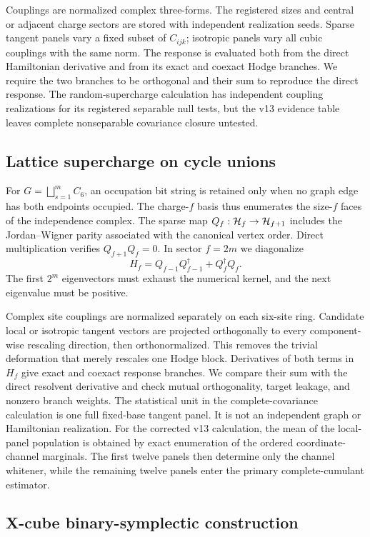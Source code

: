 Couplings are normalized complex three-forms.  The registered sizes and
central or adjacent charge sectors are stored with independent realization
seeds.  Sparse tangent panels vary a fixed subset of $C_{ijk}$; isotropic
panels vary all cubic couplings with the same norm.  The response is evaluated
both from the direct Hamiltonian derivative and from its exact and coexact
Hodge branches.  We require the two branches to be orthogonal and their sum to
reproduce the direct response.  The random-supercharge calculation has
independent coupling realizations for its registered separable null tests, but
the v13 evidence table leaves complete nonseparable covariance closure
untested.

\subsection{Lattice supercharge on cycle unions}

For $G=\bigsqcup_{s=1}^{m}C_6$, an occupation bit string is retained only when
no graph edge has both endpoints occupied.  The charge-$f$ basis thus
enumerates the size-$f$ faces of the independence complex.  The sparse map
$Q_f:\mathcal H_f\rightarrow\mathcal H_{f+1}$ includes the Jordan--Wigner parity associated
with the canonical vertex order.  Direct multiplication verifies
$Q_{f+1}Q_f=0$.  In sector $f=2m$ we diagonalize
\[
 H_f=Q_{f-1}Q_{f-1}^\dagger+Q_f^\dagger Q_f.
\]
The first $2^m$ eigenvectors must exhaust the numerical kernel, and the next
eigenvalue must be positive.

Complex site couplings are normalized separately on each six-site ring.
Candidate local or isotropic tangent vectors are projected orthogonally to
every component-wise rescaling direction, then orthonormalized.  This removes
the trivial deformation that merely rescales one Hodge block.  Derivatives of
both terms in $H_f$ give exact and coexact response branches.  We compare
their sum with the direct resolvent derivative and check mutual
orthogonality, target leakage, and nonzero branch weights.  The statistical
unit in the complete-covariance calculation is one full fixed-base tangent
panel.  It is not an independent graph or Hamiltonian realization.
For the corrected v13 calculation, the mean of the local-panel population is
obtained by exact enumeration of the ordered coordinate-channel marginals.
The first twelve panels then determine only the channel whitener, while the
remaining twelve panels enter the primary complete-cumulant estimator.

\subsection{X-cube binary-symplectic construction}

